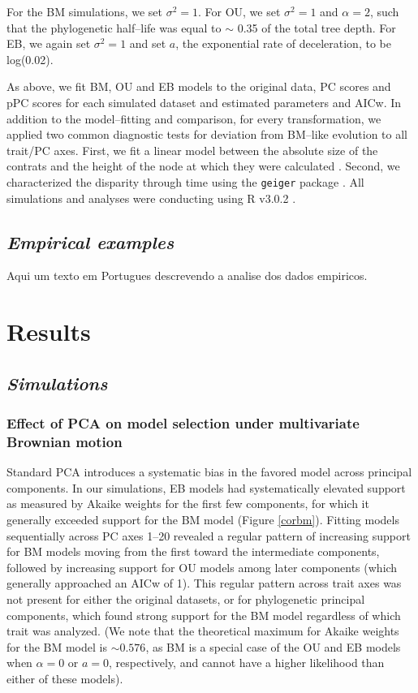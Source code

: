 \documentclass[a4paper,12pt]{article}
\begin{document}
For the BM simulations, we set $\sigma^2=\text{1}$. For OU, we set $\sigma^2=\text{1}$ and $\alpha=\text{2}$, such that the phylogenetic half--life \citep[log(2)/$\alpha$;][]{Hansen2008} was equal to $\sim$ 0.35 of the total tree depth. For EB, we again set $\sigma^2=\text{1}$ and set $a$, the exponential rate of deceleration, to be log(0.02). 

As above, we fit BM, OU and EB models to the original data, PC scores and pPC scores for each simulated dataset and estimated parameters and AICw. In addition to the model--fitting and comparison, for every transformation, we applied two common diagnostic tests for deviation from BM--like evolution to all trait/PC axes. First, we fit a linear model between the absolute size of the contrats \citep{Felsenstein1985} and the height of the node at which they were calculated \citep[i.e., the ``node height test'' of][]{FreckletonHarvey2006}. Second, we characterized the disparity through time \citep{Harmon2003} using the \texttt{geiger} package \citep{geiger2}. All simulations and analyses were conducting using R v3.0.2 \citep{R}.


\subsection{\emph{Empirical examples}}
Aqui um texto em Portugues descrevendo a analise dos dados empiricos.

\section{Results}
\subsection{\emph{Simulations}}
\subsubsection{Effect of PCA on model selection under multivariate Brownian motion}
Standard PCA introduces a systematic bias in the favored model across principal components. In our simulations, EB models had systematically elevated support as measured by Akaike weights for the first few components, for which it generally exceeded support for the BM model (Figure \ref{corbm}). Fitting models sequentially across PC axes 1--20 revealed a regular pattern of increasing support for BM models moving from the first toward the intermediate components, followed by increasing support for OU models among later components (which generally approached an AICw of 1). This regular pattern across trait axes was not present for either the original datasets, or for phylogenetic principal components, which found strong support for the BM model regardless of which trait was analyzed. (We note that the theoretical maximum for Akaike weights for the BM model is $\sim 0.576$, as BM is a special case of the OU and EB models when $\alpha=0$ or $a = 0$, respectively, and cannot have a higher likelihood than either of these models).   
\end{document}
